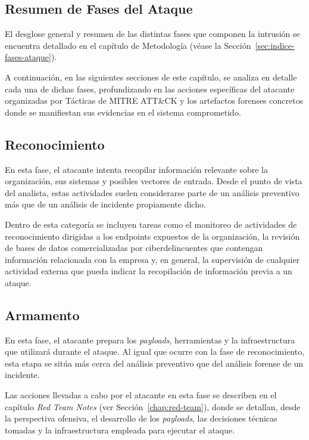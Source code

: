 \subsection{Resumen de Fases del Ataque}

El desglose general y resumen de las distintas fases que componen la intrusión se encuentra detallado en el capítulo de Metodología (véase la Sección~\ref{sec:indice-fases-ataque}). 

A continuación, en las siguientes secciones de este capítulo, se analiza en detalle cada una de dichas fases, profundizando en las acciones específicas del atacante organizadas por Tácticas de MITRE ATT\&CK y los artefactos forenses concretos donde se manifiestan sus evidencias en el sistema comprometido.




\subsection{Reconocimiento} \label{sec:reconocimiento}

En esta fase, el atacante intenta recopilar información relevante sobre la organización, sus sistemas y posibles vectores de entrada. Desde el punto de vista del analista, estas actividades suelen considerarse parte de un análisis preventivo más que de un análisis de incidente propiamente dicho.

Dentro de esta categoría se incluyen tareas como el monitoreo de actividades de reconocimiento dirigidas a los endpoints expuestos de la organización, la revisión de bases de datos comercializadas por ciberdelincuentes que contengan información relacionada con la empresa y, en general, la supervisión de cualquier actividad externa que pueda indicar la recopilación de información previa a un ataque.



\subsection{Armamento} \label{sec:armamento}

En esta fase, el atacante prepara los \textit{payloads}, herramientas y la infraestructura que utilizará durante el ataque. Al igual que ocurre con la fase de reconocimiento, esta etapa se sitúa más cerca del análisis preventivo que del análisis forense de un incidente.

Las acciones llevadas a cabo por el atacante en esta fase se describen en el capítulo \textit{Red Team Notes} (ver Sección~\ref{chap:red-team}), donde se detallan, desde la perspectiva ofensiva, el desarrollo de los \textit{payloads}, las decisiones técnicas tomadas y la infraestructura empleada para ejecutar el ataque.

